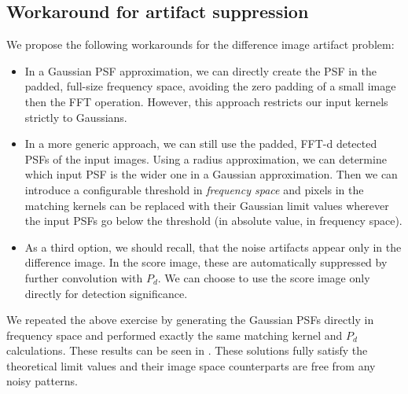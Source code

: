 \documentclass[11pt]{article}
\begin{document}
\subsection{Workaround for artifact suppression\label{sec:workaround}}
We propose the following workarounds for the difference image artifact
problem:
\begin{itemize}
  \item In a Gaussian PSF approximation, we can directly create the
    PSF in the padded, full-size frequency space, avoiding the zero
    padding of a small image then the FFT operation. However, this
    approach restricts our input kernels strictly to Gaussians.
  \item In a more generic approach, we can still use the padded, FFT-d
    detected PSFs of the input images. Using a radius approximation, we
    can determine which input PSF is the wider one in a Gaussian
    approximation. Then we can introduce a configurable threshold in
    \emph{frequency space} and pixels in the matching kernels can be
    replaced with their Gaussian limit values wherever the input PSFs
    go below the threshold (in absolute value, in frequency space).
  \item As a third option, we should recall, that the noise artifacts
    appear only in the difference image. In the score image, these are
    automatically suppressed by further convolution with \(P_d\). We
    can choose to use the score image only directly for detection
    significance.
\end{itemize}
%
\par We repeated the above exercise by generating the Gaussian PSFs directly
in frequency space and performed exactly the same matching kernel and
\(P_d\) calculations. These results can be seen in
. These
solutions fully satisfy the theoretical limit values and their image space
counterparts are free from any noisy patterns.
%
\end{document}
